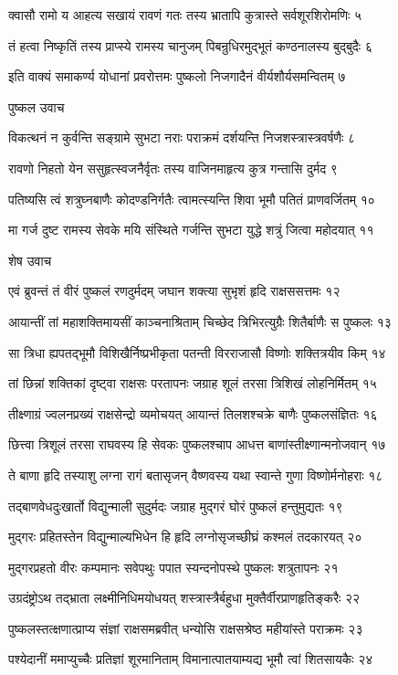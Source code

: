 क्वासौ रामो य आहत्य सखायं रावणं गतः
तस्य भ्रातापि कुत्रास्ते सर्वशूरशिरोमणिः ५

तं हत्वा निष्कृतिं तस्य प्राप्स्ये रामस्य चानुजम्
पिबन्रुधिरमुद्भूतं कण्ठनालस्य बुद्बुदैः ६

इति वाक्यं समाकर्ण्य योधानां प्रवरोत्तमः
पुष्कलो निजगादैनं वीर्यशौर्यसमन्वितम् ७

पुष्कल उवाच

विकत्थनं न कुर्वन्ति सङ्ग्रामे सुभटा नराः
पराक्रमं दर्शयन्ति निजशस्त्रास्त्रवर्षणैः ८

रावणो निहतो येन ससुहृत्स्वजनैर्वृतः
तस्य वाजिनमाहृत्य कुत्र गन्तासि दुर्मद ९

पतिष्यसि त्वं शत्रुघ्नबाणैः कोदण्डनिर्गतैः
त्वामत्स्यन्ति शिवा भूमौ पतितं प्राणवर्जितम् १०

मा गर्ज दुष्ट रामस्य सेवके मयि संस्थिते
गर्जन्ति सुभटा युद्धे शत्रुं जित्वा महोदयात् ११

शेष उवाच

एवं ब्रुवन्तं तं वीरं पुष्कलं रणदुर्मदम्
जघान शक्त्या सुभृशं हृदि राक्षससत्तमः १२

आयान्तीं तां महाशक्तिमायसीं काञ्चनाश्रिताम्
चिच्छेद त्रिभिरत्युग्रैः शितैर्बाणैः स पुष्कलः १३

सा त्रिधा ह्यपतद्भूमौ विशिखैर्निष्प्रभीकृता
पतन्ती विरराजासौ विष्णोः शक्तित्रयीव किम् १४

तां छिन्नां शक्तिकां दृष्ट्वा राक्षसः परतापनः
जग्राह शूलं तरसा त्रिशिखं लोहनिर्मितम् १५

तीक्ष्णाग्रं ज्वलनप्रख्यं राक्षसेन्द्रो व्यमोचयत्
आयान्तं तिलशश्चक्रे बाणैः पुष्कलसंज्ञितः १६

छित्त्वा त्रिशूलं तरसा राघवस्य हि सेवकः
पुष्कलश्चाप आधत्त बाणांस्तीक्ष्णान्मनोजवान् १७

ते बाणा हृदि तस्याशु लग्ना रागं बतासृजन्
वैष्णवस्य यथा स्वान्ते गुणा विष्णोर्मनोहराः १८

तद्बाणवेधदुःखार्तो विद्युन्माली सुदुर्मदः
जग्राह मुद्गरं घोरं पुष्कलं हन्तुमुद्यतः १९

मुद्गरः प्रहितस्तेन विद्युन्माल्यभिधेन हि
हृदि लग्नोसृजच्छीघ्रं कश्मलं तदकारयत् २०

मुद्गरप्रहतो वीरः कम्पमानः सवेपथुः
पपात स्यन्दनोपस्थे पुष्कलः शत्रुतापनः २१

उग्रदंष्ट्रोऽथ तद्भ्राता लक्ष्मीनिधिमयोधयत्
शस्त्रास्त्रैर्बहुधा मुक्तैर्वीरप्राणहृतिङ्करैः २२

पुष्कलस्तत्क्षणात्प्राप्य संज्ञां राक्षसमब्रवीत्
धन्योसि राक्षसश्रेष्ठ महीयांस्ते पराक्रमः २३

पश्येदानीं ममाप्युच्चैः प्रतिज्ञां शूरमानिताम्
विमानात्पातयाम्यद्य भूमौ त्वां शितसायकैः २४

